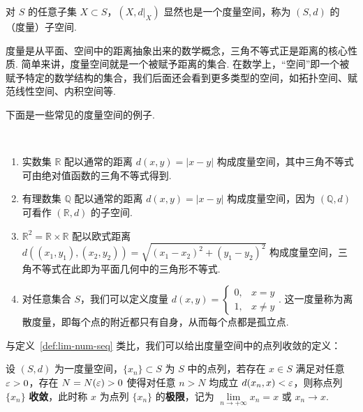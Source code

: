 \documentclass[../main.tex]{subfiles}
\begin{document}
\begin{remark}
    对 $S$ 的任意子集 $X \subset S$，$(X, d|_X)$ 显然也是一个度量空间，称为 $(S, d)$ 的（度量）子空间. 
\end{remark}

度量是从平面、空间中的距离抽象出来的数学概念，三角不等式正是距离的核心性质. 简单来讲，度量空间就是一个被赋予距离的集合. 在数学上，“空间”即一个被赋予特定的数学结构的集合，我们后面还会看到更多类型的空间，如拓扑空间、赋范线性空间、内积空间等. 

下面是一些常见的度量空间的例子. 

\begin{example}[度量空间的例子] \label{ex:metric-space}
    \ 
    \begin{enumerate}[label=(\alph*)]
        \item 实数集 $\mathbb R$ 配以通常的距离 $d(x, y) = |x - y|$ 构成度量空间，其中三角不等式可由绝对值函数的三角不等式得到. 

        \item 有理数集 $\mathbb Q$ 配以通常的距离 $d(x, y) = |x - y|$ 构成度量空间，因为 $(\mathbb Q, d)$ 可看作 $(\mathbb R, d)$ 的子空间. 

        \item $\mathbb R^2 = \mathbb R \times \mathbb R$ 配以欧式距离 $d((x_1, y_1), (x_2, y_2)) = \sqrt{(x_1 - x_2)^2 + (y_1 - y_2)^2}$ 构成度量空间，三角不等式在此即为平面几何中的三角形不等式. 
        
        \item 对任意集合 $S$，我们可以定义度量 $d(x, y) = \begin{cases}
            0, & x = y \\
            1, & x \neq y
        \end{cases}$. 这一度量称为离散度量，即每个点的附近都只有自身，从而每个点都是孤立点. 
    \end{enumerate}
\end{example}

与定义~\ref{def:lim-num-seq} 类比，我们可以给出度量空间中的点列收敛的定义：

\begin{definition}[度量空间中点列极限的定义] \label{def:lim-seq-ms}
    设 $(S, d)$ 为一度量空间，$\{x_n\} \subset S$ 为 $S$ 中的点列，若存在 $x \in S$ 满足对任意 $\varepsilon > 0$，存在 $N = N(\varepsilon) > 0$ 使得对任意 $n > N$ 均成立 $d(x_n, x) < \varepsilon$，则称点列 $\{x_n\}$ \textbf{收敛}，此时称 $x$ 为点列 $\{x_n\}$ 的\textbf{极限}，记为 $\lim\limits_{n \to +\infty} x_n = x$ 或 $x_n \to x$. 
\end{definition}
\end{document}
